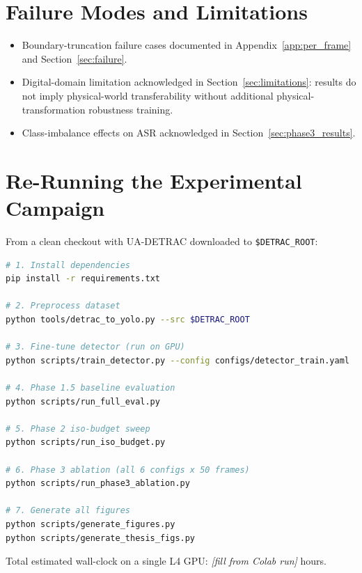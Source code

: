 \documentclass[12pt,a4paper]{report}
\begin{document}
\section{Failure Modes and Limitations}

\begin{itemize}[itemsep=4pt]
  \item[\checkmark] Boundary-truncation failure cases documented in
    Appendix~\ref{app:per_frame} and Section~\ref{sec:failure}.
  \item[\checkmark] Digital-domain limitation acknowledged in
    Section~\ref{sec:limitations}: results do not imply physical-world
    transferability without additional physical-transformation
    robustness training.
  \item[\checkmark] Class-imbalance effects on ASR acknowledged in
    Section~\ref{sec:phase3_results}.
\end{itemize}

\section{Re-Running the Experimental Campaign}

From a clean checkout with UA-DETRAC downloaded to \texttt{\$DETRAC\_ROOT}:

\begin{lstlisting}[language=bash, caption={Commands to reproduce all results.}]
# 1. Install dependencies
pip install -r requirements.txt

# 2. Preprocess dataset
python tools/detrac_to_yolo.py --src $DETRAC_ROOT

# 3. Fine-tune detector (run on GPU)
python scripts/train_detector.py --config configs/detector_train.yaml

# 4. Phase 1.5 baseline evaluation
python scripts/run_full_eval.py

# 5. Phase 2 iso-budget sweep
python scripts/run_iso_budget.py

# 6. Phase 3 ablation (all 6 configs x 50 frames)
python scripts/run_phase3_ablation.py

# 7. Generate all figures
python scripts/generate_figures.py
python scripts/generate_thesis_figs.py
\end{lstlisting}

Total estimated wall-clock on a single L4 GPU:
\textit{[fill from Colab run]} hours.
\end{document}

